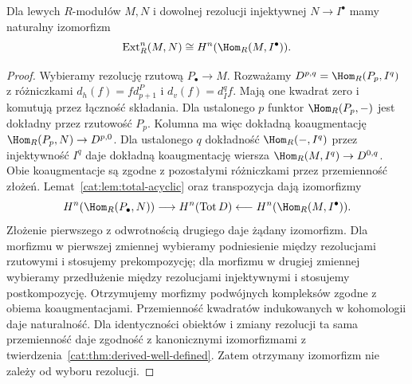 \begin{twierdzenie}\label{cat:thm:ext-balanced}
Dla lewych $R$-modułów $M,N$ i dowolnej rezolucji injektywnej $N\to I^\bullet$ mamy naturalny izomorfizm
\[
 \operatorname{Ext}_R^n(M,N)\cong H^n(\Hom_R(M,I^\bullet)).
\]
\end{twierdzenie}
\begin{proof}
Wybieramy rezolucję rzutową $P_\bullet\to M$. Rozważamy $D^{p,q}=\Hom_R(P_p,I^q)$ z różniczkami $d_h(f)=f d_{p+1}^P$ i $d_v(f)=d_I^q f$. Mają one kwadrat zero i komutują przez łączność składania. Dla ustalonego $p$ funktor $\Hom_R(P_p,-)$ jest dokładny przez rzutowość $P_p$. Kolumna ma więc dokładną koaugmentację $\Hom_R(P_p,N)\to D^{p,0}$. Dla ustalonego $q$ dokładność $\Hom_R(-,I^q)$ przez injektywność $I^q$ daje dokładną koaugmentację wiersza $\Hom_R(M,I^q)\to D^{0,q}$. Obie koaugmentacje są zgodne z pozostałymi różniczkami przez przemienność złożeń. Lemat~\ref{cat:lem:total-acyclic} oraz transpozycja dają izomorfizmy
\[
 H^n(\Hom_R(P_\bullet,N))
 \longrightarrow H^n(\operatorname{Tot}D)
 \longleftarrow H^n(\Hom_R(M,I^\bullet)).
\]
Złożenie pierwszego z odwrotnością drugiego daje żądany izomorfizm. Dla morfizmu w pierwszej zmiennej wybieramy podniesienie między rezolucjami rzutowymi i stosujemy prekompozycję; dla morfizmu w drugiej zmiennej wybieramy przedłużenie między rezolucjami injektywnymi i stosujemy postkompozycję. Otrzymujemy morfizmy podwójnych kompleksów zgodne z obiema koaugmentacjami. Przemienność kwadratów indukowanych w kohomologii daje naturalność. Dla identyczności obiektów i zmiany rezolucji ta sama przemienność daje zgodność z kanonicznymi izomorfizmami z twierdzenia~\ref{cat:thm:derived-well-defined}. Zatem otrzymany izomorfizm nie zależy od wyboru rezolucji.
\end{proof}

